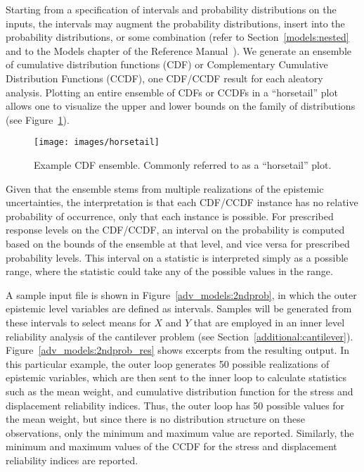 Starting from a specification of intervals and probability distributions 
on the inputs, %
the intervals may augment the probability distributions, insert into
the probability distributions, or some combination (refer to 
Section~\ref{models:nested} and to the Models chapter of the Reference 
Manual~\cite{RefMan}). We generate an
ensemble of cumulative distribution functions (CDF) or Complementary
Cumulative Distribution Functions (CCDF), one CDF/CCDF result for each
aleatory analysis. Plotting an entire ensemble of CDFs or CCDFs in a 
``horsetail'' plot allows one to visualize the upper and lower bounds 
on the family of distributions (see Figure~\ref{fig:horsetail}).
\begin{figure}[h!]%
 \begin{center}
 \texttt{[image: images/horsetail]}
 \caption{Example CDF ensemble. Commonly referred to as a ``horsetail'' plot.}
 \label{fig:horsetail}
 \end{center} 
\end{figure}
Given that the ensemble stems from multiple
realizations of the epistemic uncertainties, the interpretation is
that each CDF/CCDF instance has no relative probability of occurrence,
only that each instance is possible. For prescribed response levels
on the CDF/CCDF, an interval on the probability is computed based on
the bounds of the ensemble at that level, and vice versa for
prescribed probability levels. This interval on a statistic is
interpreted simply as a possible range, where the statistic could take
any of the possible values in the range.

A sample input file is shown in Figure~\ref{adv_models:2ndprob}, in
which the outer epistemic level variables are defined as
intervals. Samples will be generated from these intervals to select
means for $X$ and $Y$ that are employed in an inner level reliability
analysis of the cantilever problem (see
Section~\ref{additional:cantilever}).
Figure~\ref{adv_models:2ndprob_res} shows excerpts from the resulting
output. In this particular example, the outer loop generates 50
possible realizations of epistemic variables, which are then sent to
the inner loop to calculate statistics such as the mean weight, and
cumulative distribution function for the stress and displacement
reliability indices. Thus, the outer loop has 50 possible values for
the mean weight, but since there is no distribution structure on these
observations, only the minimum and maximum value are reported.
Similarly, the minimum and maximum values of the CCDF for the stress
and displacement reliability indices are reported.

